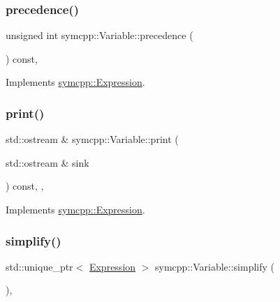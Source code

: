 \subsubsection{\texorpdfstring{precedence()}{precedence()}}
{\footnotesize\ttfamily unsigned int symcpp\+::\+Variable\+::precedence (\begin{DoxyParamCaption}{ }\end{DoxyParamCaption}) const\hspace{0.3cm}{\ttfamily [override]}, {\ttfamily [virtual]}}



Implements \mbox{\hyperlink{classsymcpp_1_1Expression_a181c162d5740faac392ffdca26bfca0c}{symcpp\+::\+Expression}}.

\mbox{\label{classsymcpp_1_1Variable_a10ce030c1648fae51534712155ffcab1}} 
\subsubsection{\texorpdfstring{print()}{print()}}
{\footnotesize\ttfamily std\+::ostream \& symcpp\+::\+Variable\+::print (\begin{DoxyParamCaption}\item[{std\+::ostream \&}]{sink }\end{DoxyParamCaption}) const\hspace{0.3cm}{\ttfamily [override]}, {\ttfamily [private]}, {\ttfamily [virtual]}}



Implements \mbox{\hyperlink{classsymcpp_1_1Expression_af37e13032a40f2da4d2866eaa8658049}{symcpp\+::\+Expression}}.

\mbox{\label{classsymcpp_1_1Variable_afd613d28c73d738fc0cf90b70e1820bb}} 
\subsubsection{\texorpdfstring{simplify()}{simplify()}}
{\footnotesize\ttfamily std\+::unique\+\_\+ptr$<$ \mbox{\hyperlink{classsymcpp_1_1Expression}{Expression}} $>$ symcpp\+::\+Variable\+::simplify (\begin{DoxyParamCaption}{ }\end{DoxyParamCaption})\hspace{0.3cm}{\ttfamily [override]}, {\ttfamily [virtual]}}



